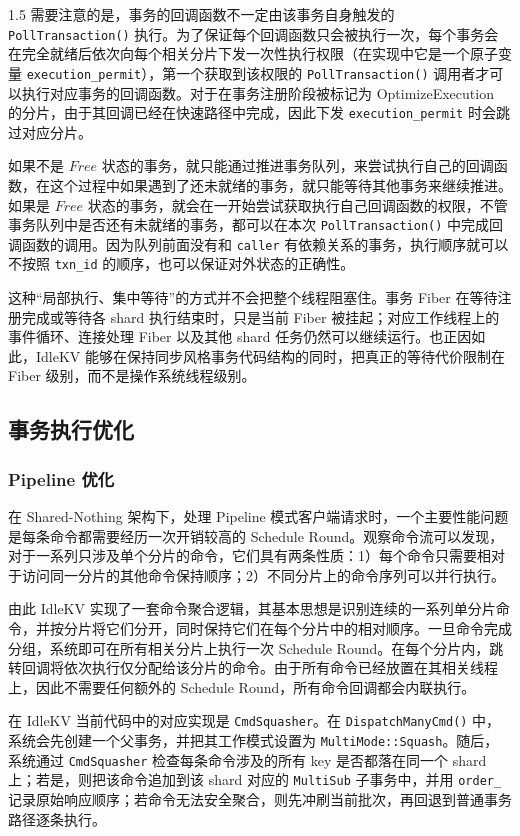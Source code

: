 \documentclass[a4paper,12pt,fontset=none,twoside]{article}
\numberwithin{figure}{section}
\numberwithin{equation}{section}
\numberwithin{table}{section}
\begin{document}
\begin{spacing}{1.5}
	需要注意的是，事务的回调函数不一定由该事务自身触发的 \texttt{PollTransaction()} 执行。为了保证每个回调函数只会被执行一次，每个事务会在完全就绪后依次向每个相关分片下发一次性执行权限（在实现中它是一个原子变量 \texttt{execution\_permit}），第一个获取到该权限的 \texttt{PollTransaction()} 调用者才可以执行对应事务的回调函数。对于在事务注册阶段被标记为 OptimizeExecution 的分片，由于其回调已经在快速路径中完成，因此下发 \texttt{execution\_permit} 时会跳过对应分片。

	如果不是 $Free$ 状态的事务，就只能通过推进事务队列，来尝试执行自己的回调函数，在这个过程中如果遇到了还未就绪的事务，就只能等待其他事务来继续推进。如果是 $Free$ 状态的事务，就会在一开始尝试获取执行自己回调函数的权限，不管事务队列中是否还有未就绪的事务，都可以在本次 \texttt{PollTransaction()} 中完成回调函数的调用。因为队列前面没有和 \texttt{caller} 有依赖关系的事务，执行顺序就可以不按照 \texttt{txn\_id} 的顺序，也可以保证对外状态的正确性。

	这种“局部执行、集中等待”的方式并不会把整个线程阻塞住。事务 Fiber 在等待注册完成或等待各 shard 执行结束时，只是当前 Fiber 被挂起；对应工作线程上的事件循环、连接处理 Fiber 以及其他 shard 任务仍然可以继续运行。也正因如此，IdleKV 能够在保持同步风格事务代码结构的同时，把真正的等待代价限制在 Fiber 级别，而不是操作系统线程级别。


	\subsection{事务执行优化}


	\subsubsection{Pipeline 优化}

	在 Shared-Nothing 架构下，处理 Pipeline 模式客户端请求时，一个主要性能问题是每条命令都需要经历一次开销较高的 Schedule Round。观察命令流可以发现，对于一系列只涉及单个分片的命令，它们具有两条性质：1）每个命令只需要相对于访问同一分片的其他命令保持顺序；2）不同分片上的命令序列可以并行执行。
	
	由此 IdleKV 实现了一套命令聚合逻辑，其基本思想是识别连续的一系列单分片命令，并按分片将它们分开，同时保持它们在每个分片中的相对顺序。一旦命令完成分组，系统即可在所有相关分片上执行一次 Schedule Round。在每个分片内，跳转回调将依次执行仅分配给该分片的命令。由于所有命令已经放置在其相关线程上，因此不需要任何额外的 Schedule Round，所有命令回调都会内联执行。

	在 IdleKV 当前代码中的对应实现是 \texttt{CmdSquasher}。在 \texttt{DispatchManyCmd()} 中，系统会先创建一个父事务，并把其工作模式设置为 \texttt{MultiMode::Squash}。随后，系统通过 \texttt{CmdSquasher} 检查每条命令涉及的所有 key 是否都落在同一个 shard 上；若是，则把该命令追加到该 shard 对应的 \texttt{MultiSub} 子事务中，并用 \texttt{order\_} 记录原始响应顺序；若命令无法安全聚合，则先冲刷当前批次，再回退到普通事务路径逐条执行。


\end{spacing}
\end{document}
